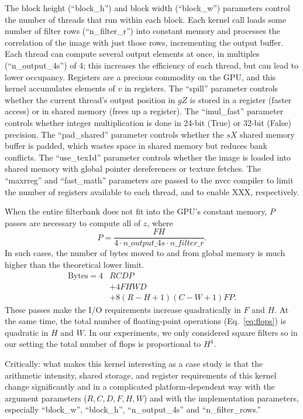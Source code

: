 \documentclass{sig-alternate}
\begin{document}
The block height (``block\_h'') and block width (``block\_w'') parameters control the
number of threads that run within each block.
Each kernel call loads some number of filter rows (``n\_filter\_r'') into
constant memory and processes the correlation of the image with just those
rows, incrementing the output buffer.
Each thread can compute several output elements
at once, in multiples (``n\_output\_4s'') of 4;
this increases the efficiency of each thread, but can lead to lower occupancy.
Registers are a precious commodity on the GPU, and this kernel accumulates
elements of $v$ in registers.
The ``spill'' parameter controls whether the current thread's output position in
$gZ$ is stored in a register (faster access) or in shared memory (frees up
a register).
The ``imul\_fast'' parameter controls whether integer multiplication is done
in 24-bit (True) or 32-bit (False) precision.
The ``pad\_shared'' parameter controls whether the $sX$ shared memory buffer
is padded, which wastes space in shared memory but reduces bank conflicts.
The ``use\_tex1d'' parameter controls whether the image is loaded into shared
memory with global pointer dereferences or texture fetches.
The ``maxrreg'' and ``fast\_math'' parameters are passed to the nvcc compiler to limit
the number of registers available to each thread, and to enable XXX,
respectively.



When the entire filterbank does not fit into the GPU's
constant memory, $P$ passes are necessary to compute all of $z$, where
$$P=\frac{FH}{4 \cdot n\_output\_4s \cdot n\_filter\_r}.$$
In such cases, the number of bytes moved to and from global memory is much higher than
the theoretical lower limit.
\begin{align}
\mathrm{Bytes} = 4&RCDP \nonumber \\
& + 4FHWD \nonumber \\
& + 8(R-H+1)(C-W+1)FP.
\nonumber
\label{eq:bytesP}
\end{align}
These passes make the I/O requirements increase quadratically in $F$ and $H$.
At the same time, the total number of floating-point operations (Eq.~\ref{eq:flops})
is quadratic in $H$ and $W$. In our experiments, we only considered square
filters so in our setting the total number of flops is proportional to $H^4$.

Critically:
what makes this kernel interesting as a case study is that the
arithmetic intensity, shared storage, and register requirements
of this kernel change significantly and in a complicated platform-dependent way
with the argument parameters ($R, C, D, F, H, W$) and with the implementation parameters,
especially ``block\_w'', ``block\_h'', ``n\_output\_4s'' and ``n\_filter\_rows.''
\end{document}
